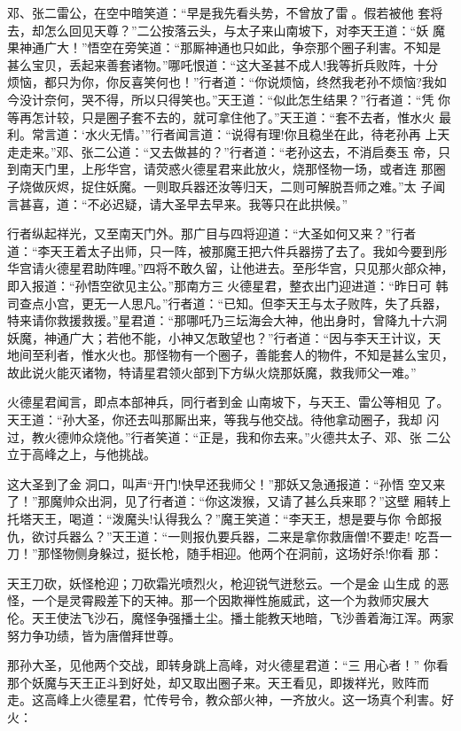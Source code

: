 邓、张二雷公，在空中暗笑道：“早是我先看头势，不曾放了雷。假若被他
套将去，却怎么回见天尊？”二公按落云头，与太子来山南坡下，对李天王道：“妖
魔果神通广大！”悟空在旁笑道：“那厮神通也只如此，争奈那个圈子利害。不知是
甚么宝贝，丢起来善套诸物。”哪吒恨道：“这大圣甚不成人!我等折兵败阵，十分
烦恼，都只为你，你反喜笑何也！”行者道：“你说烦恼，终然我老孙不烦恼?我如
今没计奈何，哭不得，所以只得笑也。”天王道：“似此怎生结果？”行者道：“凭
你等再怎计较，只是圈子套不去的，就可拿住他了。”天王道：“套不去者，惟水火
最利。常言道：‘水火无情。’”行者闻言道：“说得有理!你且稳坐在此，待老孙再
上天走走来。”邓、张二公道：“又去做甚的？”行者道：“老孙这去，不消启奏玉
帝，只到南天门里，上彤华宫，请荧惑火德星君来此放火，烧那怪物一场，或者连
那圈子烧做灰烬，捉住妖魔。一则取兵器还汝等归天，二则可解脱吾师之难。”太
子闻言甚喜，道：“不必迟疑，请大圣早去早来。我等只在此拱候。”

行者纵起祥光，又至南天门外。那广目与四将迎道：“大圣如何又来？”行者
道：“李天王着太子出师，只一阵，被那魔王把六件兵器捞了去了。我如今要到彤
华宫请火德星君助阵哩。”四将不敢久留，让他进去。至彤华宫，只见那火部众神，
即入报道：“孙悟空欲见主公。”那南方三火德星君，整衣出门迎进道：“昨日可
韩司查点小宫，更无一人思凡。”行者道：“已知。但李天王与太子败阵，失了兵器，
特来请你救援救援。”星君道：“那哪吒乃三坛海会大神，他出身时，曾降九十六洞
妖魔，神通广大；若他不能，小神又怎敢望也？”行者道：“因与李天王计议，天
地间至利者，惟水火也。那怪物有一个圈子，善能套人的物件，不知是甚么宝贝，
故此说火能灭诸物，特请星君领火部到下方纵火烧那妖魔，救我师父一难。”

火德星君闻言，即点本部神兵，同行者到金山南坡下，与天王、雷公等相见
了。天王道：“孙大圣，你还去叫那厮出来，等我与他交战。待他拿动圈子，我却
闪过，教火德帅众烧他。”行者笑道：“正是，我和你去来。”火德共太子、邓、张
二公立于高峰之上，与他挑战。

这大圣到了金洞口，叫声“开门!快早还我师父！”那妖又急通报道：“孙悟
空又来了！”那魔帅众出洞，见了行者道：“你这泼猴，又请了甚么兵来耶？”这壁
厢转上托塔天王，喝道：“泼魔头!认得我么？”魔王笑道：“李天王，想是要与你
令郎报仇，欲讨兵器么？”天王道：“一则报仇要兵器，二来是拿你救唐僧!不要走!
吃吾一刀！”那怪物侧身躲过，挺长枪，随手相迎。他两个在洞前，这场好杀!你看
那：

天王刀砍，妖怪枪迎；刀砍霜光喷烈火，枪迎锐气迸愁云。一个是金山生成
的恶怪，一个是灵霄殿差下的天神。那一个因欺禅性施威武，这一个为救师灾展大
伦。天王使法飞沙石，魔怪争强播土尘。播土能教天地暗，飞沙善着海江浑。两家
努力争功绩，皆为唐僧拜世尊。

那孙大圣，见他两个交战，即转身跳上高峰，对火德星君道：“三用心者！”
你看那个妖魔与天王正斗到好处，却又取出圈子来。天王看见，即拨祥光，败阵而
走。这高峰上火德星君，忙传号令，教众部火神，一齐放火。这一场真个利害。好
火：

